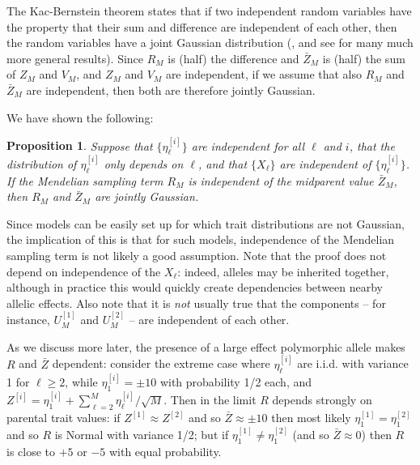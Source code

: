 \documentclass{article}
\newcommand{\1}{\mathbbm{1}}
\newtheorem{prop}{Proposition}
\theoremstyle{remark}
\theoremstyle{definition}
\begin{document}
The Kac-Bernstein theorem states that if two independent random variables
have the property that their sum and difference are independent of each other,
then the random variables have a joint Gaussian distribution
(\citet{kac1939characterization,bernstein1941property},
and see \citet{kagan1973characterization} for many much more general results).
Since $R_M$ is (half) the difference and $\bar Z_M$ is (half) the sum
of $Z_M$ and $V_M$, and $Z_M$ and $V_M$ are independent,
if we assume that also $R_M$ and $\bar Z_M$ are independent,
then both are therefore jointly Gaussian.

We have shown the following:

\begin{prop}\label{prop:parental_contribs}
    Suppose that $\{\eta_\ell^{[i]}\}$ are independent for all $\ell$ and $i$,
    that the distribution of $\eta_\ell^{[i]}$ only depends on $\ell$,
    and that $\{X_\ell\}$ are independent of $\{\eta_\ell^{[i]}\}$.
    If the Mendelian sampling term $R_M$ is independent of the midparent value $\bar Z_M$,
    then $R_M$ and $\bar Z_M$ are jointly Gaussian.
\end{prop}


Since models can be easily set up for which trait distributions are not Gaussian,
the implication of this is that for such models, independence of the Mendelian sampling term
is not likely a good assumption. 
Note that the proof does not depend on independence of the $X_\ell$:
indeed, alleles may be inherited together,
although in practice this would quickly create dependencies between nearby allelic effects. 
Also note that it is \emph{not} usually true that the components --
for instance, $U_M^{[1]}$ and $U_M^{[2]}$ --
are independent of each other.

As we discuss more later,
the presence of a large effect polymorphic allele
makes $R$ and $\bar Z$ dependent:
consider the extreme case where $\eta^{[i]}_\ell$ are i.i.d.{} with variance 1 for $\ell \ge 2$,
while $\eta^{[i]}_1 = \pm 10$ with probability 1/2 each,
and $Z^{[i]} = \eta_1^{[i]} + \sum_{\ell=2}^M \eta_\ell^{[i]} / \sqrt{M}$.
Then in the limit $R$ depends strongly on parental trait values:
if $Z^{[1]} \approx Z^{[2]}$ and so $\bar Z \approx \pm 10$ then most likely
$\eta_1^{[1]} = \eta_1^{[2]}$ and so $R$ is Normal with variance 1/2;
but if $\eta_1^{[1]} \neq \eta_1^{[2]}$ (and so $\bar Z \approx 0$)
then $R$ is close to $+5$ or $-5$ with equal probability.
\end{document}
